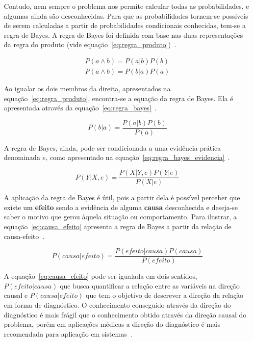 Contudo, nem sempre o problema nos permite calcular todas as probabilidades, e algumas ainda são desconhecidas. Para que as probabilidades tornem-se possíveis de serem calculadas a partir de probabilidades condicionais conhecidas, tem-se a regra de Bayes. A regra de Bayes foi definida com base nas duas representações da regra do produto (vide equação~\ref{eq:regra_produto})~\cite{russell:2002}.

\begin{subequations}
    \label{eq:regra_produto}
    \begin{align}
        P(a \land b) = P(a|b)P(b)\\
        P(a \land b) = P(b|a)P(a)
    \end{align}
\end{subequations}

Ao igualar os dois membros da direita, apresentados na equação~\ref{eq:regra_produto}, encontra-se a equação da regra de Bayes. Ela é apresentada através da equação~\ref{eq:regra_bayes}~\cite{russell:2002}.

\begin{equation}
    \label{eq:regra_bayes}
    P(b|a) = \frac{P(a|b)P(b)}{P(a)}
\end{equation}

A regra de Bayes, ainda, pode ser condicionada a uma evidência prática denominada $e$, como apresentado na equação~\ref{eq:regra_bayes_evidencia}~\cite{russell:2002}.

\begin{equation}
    \label{eq:regra_bayes_evidencia}
    P(Y|X, e) = \frac{P(X|Y, e)P(Y|e)}{P(X|e)}
\end{equation}

A aplicação da regra de Bayes é útil, pois a partir dela é possível perceber que existe um \textbf{efeito} sendo a evidência de alguma \textbf{causa} desconhecida e deseja-se saber o motivo que gerou àquela situação ou comportamento. Para ilustrar, a equação~\ref{eq:causa_efeito} apresenta a regra de Bayes a partir da relação de causa-efeito~\cite{russell:2002}.

\begin{equation}
    \label{eq:causa_efeito}
    P(causa|efeito) = \frac{P(efeito|causa)P(causa)}{P(efeito)}
\end{equation}

A equação~\ref{eq:causa_efeito} pode ser igualada em dois sentidos, $P(efeito|causa)$ que busca quantificar a relação entre as variáveis na direção causal e $P(causa|efeito)$ que tem o objetivo de descrever a direção da relação em forma de diagnóstico. O conhecimento conseguido através da direção do diagnóstico é mais frágil que o conhecimento obtido através da direção causal do problema, porém em aplicações médicas a direção do diagnóstico é mais recomendada para aplicação em sistemas~\cite{russell:2002}.

